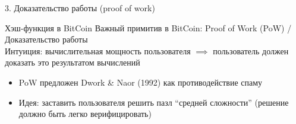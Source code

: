 \documentclass[usenames,dvipsnames,8pt,aspectratio=169]{beamer}
\begin{document}
\begin{frame}

\begin{LARGE}
	
	
	\color{Orange}
	3. Доказательство работы (proof of work)
	
\end{LARGE}
\end{frame}




\begin{frame}{Хэш-функция в  BitCoin}
\Large
Важный примитив в BitCoin: {\color{Orange} Proof of Work (PoW) / Доказательство работы} \\[10pt]
Интуиция: вычислительная мощность пользователя $\implies$ пользователь должен доказать это результатом вычислений \\
\vspace{15pt}
\begin{itemize}
	\itemsep 1em
	\item PoW предложен Dwork \& Naor (1992) как противодействие спаму
	\item {\color{Orange} Идея:}  заставить пользователя решить пазл ``средней сложности''  (решение должно быть легко верифицировать)
\end{itemize}
\end{frame}
\end{document}
